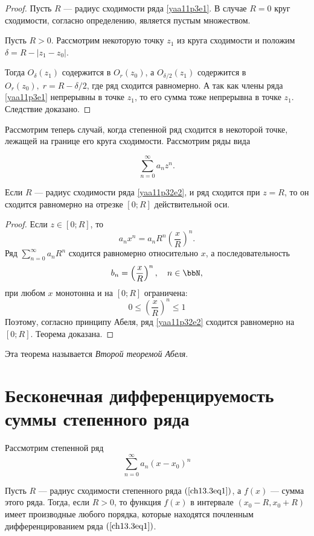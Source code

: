 \begin{proof}
Пусть $R$ --- радиус сходимости ряда \eqref{yaa11p3e1}. В случае $R=0$ круг сходимости, согласно определению, является пустым множеством.

Пусть $R>0$. Рассмотрим некоторую точку $z_1$ из круга сходимости и положим $\delta=R-|z_1-z_0|$.

Тогда $O_{\delta}(z_1)$ содержится в $O_r(z_0)$, а $O_{\delta /2}(z_1)$ содержится в $O_r(z_0),\; r=R-\delta /2$, где ряд сходится равномерно. А так как члены ряда \eqref{yaa11p3e1} непрерывны в точке $z_1$, то его сумма тоже непрерывна в точке $z_1$. Следствие доказано.
\end{proof}

Рассмотрим теперь случай, когда степенной ряд сходится в некоторой точке, лежащей на границе его круга сходимости. Рассмотрим ряды вида

\begin{equation}\label{yaa11p32e2}
\sum\limits_{n=0}^{\infty} a_nz^n.
\end{equation}

\begin{thm}
Если $R$ --- радиус сходимости ряда \eqref{yaa11p32e2}, и ряд сходится при $z=R$, то он сходится равномерно на отрезке $[0;R]$ действительной оси.
\end{thm}

\begin{proof}
Если $z\in[0;R]$, то
$$
a_nx^n=a_nR^n\left(\frac{x}{R}\right)^n.
$$
Ряд $\sum\limits_{n=0}^{\infty} a_nR^n$ сходится равномерно относительно $x$, а последовательность
$$
b_n=\left(\frac{x}{R}\right)^n,\quad n\in \bbN,
$$
при любом $x$ монотонна и на $[0;R]$ ограничена:
$$
0\le \left(\frac{x}{R}\right)^n\le 1
$$
Поэтому, согласно принципу Абеля, ряд \eqref{yaa11p32e2} сходится равномерно на $[0;R]$. Теорема доказана.
\end{proof}

Эта теорема называется \textit{Второй теоремой Абеля}.


\section{Бесконечная дифференцируемость суммы степенного ряда}
Рассмотрим степенной ряд
\begin{equation} \label{ch13.3eq1}
\sum\limits_{n = 0}^{\infty} a_n (x - x_0)^n
\end{equation}
\begin{thm} \label{ch13.3thm2}
Пусть $R$ --- радиус сходимости степенного ряда $(\ref{ch13.3eq1})$, а $f(x)$ --- сумма этого ряда. Тогда, если $R > 0$, то функция $f(x)$ в интервале $(x_0 - R, x_0 + R)$ имеет производные любого порядка, которые находятся почленным дифференцированием ряда $(\ref{ch13.3eq1})$.
\end{thm}

